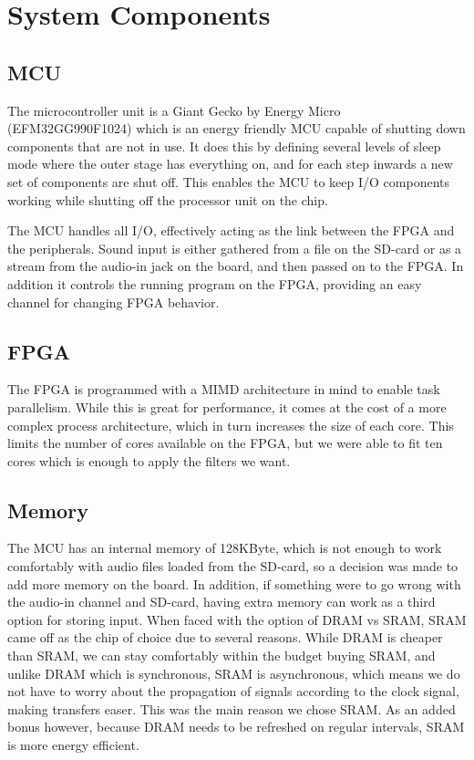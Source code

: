 \section{System Components}
\subsection{MCU}
The microcontroller unit is a Giant Gecko by Energy Micro (EFM32GG990F1024) which is an energy friendly MCU capable of shutting down components that are not in use. It does this by defining several levels of sleep mode where the outer stage has everything on, and for each step inwards a new set of components are shut off. This enables the MCU to keep I/O components working while shutting off the processor unit on the chip.

The MCU handles all I/O, effectively acting as the link between the FPGA and the peripherals. Sound input is either gathered from a file on the SD-card or as a stream from the audio-in jack on the board, and then passed on to the FPGA. In addition it controls the running program on the FPGA, providing an easy channel for changing FPGA behavior.
\subsection{FPGA}
The FPGA is programmed with a MIMD architecture in mind to enable task parallelism. While this is great for performance, it comes at the cost of a more complex process architecture, which in turn increases the size of each core. This limits the number of cores available on the FPGA, but we were able to fit ten cores which is enough to apply the filters we want.
\subsection{Memory}
The MCU has an internal memory of 128KByte, which is not enough to work comfortably with audio files loaded from the SD-card, so a decision was made to add more memory on the board. In addition, if something were to go wrong with the audio-in channel and SD-card, having extra memory can work as a third option for storing input. When faced with the option of DRAM vs SRAM, SRAM came off as the chip of choice due to several reasons. While DRAM is cheaper than SRAM, we can stay comfortably within the budget buying SRAM, and unlike DRAM which is synchronous, SRAM is asynchronous, which means we do not have to worry about the propagation of signals according to the clock signal, making transfers easer. This was the main reason we chose SRAM. As an added bonus however, because DRAM needs to be refreshed on regular intervals, SRAM is more energy efficient.
